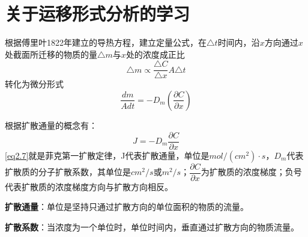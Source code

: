 \chapter{关于运移形式分析的学习}
根据傅里叶1822年建立的导热方程，建立定量公式，在$\triangle t$时间内，沿$x$方向通过$x$处截面所迁移的物质的量$\triangle m$与$x$处的浓度\textcolor[rgb]{1,0,0}{成正比}
\begin{equation*}
    \triangle m \propto \dfrac{\triangle C}{\triangle x} A \triangle t
\end{equation*}
转化为微分形式
\begin{equation*}
    \dfrac{dm}{Adt} = - D_m\left(\dfrac{\partial C}{\partial x}\right)
\end{equation*}


根据扩散通量的概念有：
\begin{equation}
    J = -D_m\dfrac{\partial C}{ \partial x}
    \label{eq2.7}
\end{equation}
\cref{eq2.7}就是\textcolor[rgb]{1,0,0}{菲克第一扩散定律}，J代表扩散通量，单位是$mol/(cm^2)\cdot s$，$D_m$代表扩散质的分子扩散系数，其单位是$cm^2/s$或$m^2/s$；$\dfrac{\partial C}{\partial x}$为扩散质的浓度梯度；负号代表扩散质的浓度梯度方向与扩散方向相反。

\textbf{\textcolor[rgb]{1,0,0}{扩散通量}}：单位是坚持只通过扩散方向的单位面积的物质的流量。

\textbf{\textcolor[rgb]{1,0,0}{扩散系数}}：当浓度为一个单位时，单位时间内，垂直通过扩散方向的物质流量。

